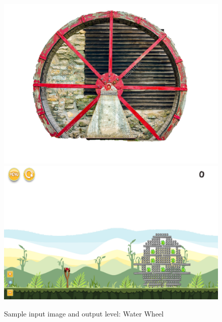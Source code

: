 \documentclass{dalthesis}
\begin{document}
\begin{figure}
	\caption{Sample input image and output level: Water Wheel}
  \includegraphics[width=\textwidth,height=\textheight,keepaspectratio]{levels/pictures/mechanisms/water_wheel.jpg}
  \includegraphics[width=\textwidth,height=\textheight,keepaspectratio]{levels/screenshots/mechanisms/water_wheel.png}
\end{figure}
\end{document}
